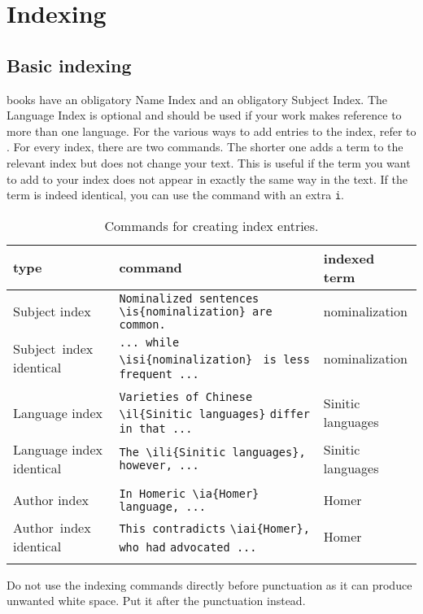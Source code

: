 \chapter{Indexing}
\section{Basic indexing}
\lsp books have an obligatory Name Index and an obligatory Subject Index. The Language Index is optional and should be used if your work makes reference to more than one language. 
For the various ways to add entries to the index, refer to . For every index, there are two commands. The shorter one adds a term to the relevant index but does not change your text. This is useful if the term you want to add to your index does not appear in exactly the same way in the text. If the term is indeed identical, you can use the command with an extra \verb+i+.

\begin{table}[h] 
\caption{Commands for creating index entries.}
\label{tab:latex:indexentriese}
 \begin{tabular}{p{1.9cm}>{\small\raggedright}p{6.5cm}l}
  \lsptoprule
  type & \upshape\normalsize command & indexed term \\
  \midrule
  Subject index& \verb+Nominalized sentences+ \verb+\is{nominalization} are+ \verb+common.+ & nomina\-lization \\
  \tablevspace
  \mbox{Subject index} identical& \verb+... while \isi{nominalization}+ \verb+ is less frequent ...+  & nomina\-lization \\\\
  \tablevspace
  Language index & \verb+Varieties of Chinese+ \verb+\il{Sinitic languages}+ \verb+differ in that ...+ & Sinitic languages \\
  \tablevspace
  Language index identical& \verb+The \ili{Sinitic languages},+ \verb+however, ... + & Sinitic languages \\\\
  \tablevspace
  Author index & \verb+In Homeric \ia{Homer}+ \verb+language, ... + & Homer\\
  \tablevspace
  \mbox{Author index} identical & \verb+This contradicts+ \verb+\iai{Homer}, who had+ \verb+advocated ...+ & Homer \\
  \lspbottomrule
 \end{tabular}
\end{table}

Do not use the indexing commands directly before punctuation as it can produce unwanted white space. Put it after the punctuation instead.

